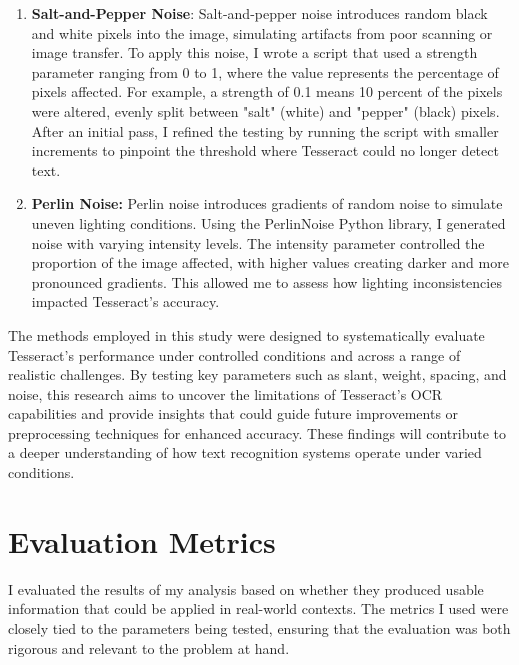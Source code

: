 \documentclass[10pt,twocolumn]{article}
\begin{document}
\begin{enumerate}
    \item \textbf{Salt-and-Pepper Noise}: Salt-and-pepper noise introduces random black and white pixels into the image, simulating artifacts from poor scanning or image transfer. To apply this noise, I wrote a script that used a strength parameter ranging from 0 to 1, where the value represents the percentage of pixels affected. For example, a strength of 0.1 means 10 percent of the pixels were altered, evenly split between "salt" (white) and "pepper" (black) pixels. After an initial pass, I refined the testing by running the script with smaller increments to pinpoint the threshold where Tesseract could no longer detect text.
    \item \textbf{Perlin Noise:} Perlin noise introduces gradients of random noise to simulate uneven lighting conditions. Using the PerlinNoise Python library, I generated noise with varying intensity levels. The intensity parameter controlled the proportion of the image affected, with higher values creating darker and more pronounced gradients. This allowed me to assess how lighting inconsistencies impacted Tesseract’s accuracy.

\end{enumerate}
The methods employed in this study were designed to systematically evaluate Tesseract's performance under controlled conditions and across a range of realistic challenges. By testing key parameters such as slant, weight, spacing, and noise, this research aims to uncover the limitations of Tesseract's OCR capabilities and provide insights that could guide future improvements or preprocessing techniques for enhanced accuracy. These findings will contribute to a deeper understanding of how text recognition systems operate under varied conditions.
 
\section{Evaluation Metrics}
I evaluated the results of my analysis based on whether they produced usable information that could be applied in real-world contexts. The metrics I used were closely tied to the parameters being tested, ensuring that the evaluation was both rigorous and relevant to the problem at hand.
\end{document}
